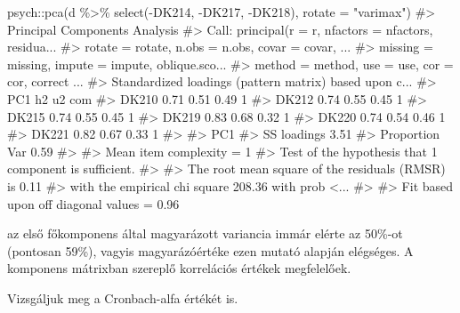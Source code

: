 \documentclass[
  letterpaper,
]{krantz}
\makeatletter
\newenvironment{Shaded}{\begin{snugshade}}{\end{snugshade}}
\newcommand{\AttributeTok}[1]{\textcolor[rgb]{0.40,0.45,0.13}{#1}}
\newcommand{\CommentTok}[1]{\textcolor[rgb]{0.37,0.37,0.37}{#1}}
\newcommand{\FunctionTok}[1]{\textcolor[rgb]{0.28,0.35,0.67}{#1}}
\newcommand{\NormalTok}[1]{\textcolor[rgb]{0.00,0.23,0.31}{#1}}
\newcommand{\SpecialCharTok}[1]{\textcolor[rgb]{0.37,0.37,0.37}{#1}}
\newcommand{\StringTok}[1]{\textcolor[rgb]{0.13,0.47,0.30}{#1}}
\newenvironment{kframe}{%
\medskip{}
\setlength{\fboxsep}{.8em}
 \def\at@end@of@kframe{}%
 \ifinner\ifhmode%
  \def\at@end@of@kframe{\end{minipage}}%
  \begin{minipage}{\columnwidth}%
 \fi\fi%
 \def\FrameCommand##1{\hskip\@totalleftmargin \hskip-\fboxsep
 \colorbox{shadecolor}{##1}\hskip-\fboxsep
     \hskip-\linewidth \hskip-\@totalleftmargin \hskip\columnwidth}%
 \MakeFramed {\advance\hsize-\width
   \@totalleftmargin\z@ \linewidth\hsize
   \@setminipage}}%
 {\par\unskip\endMakeFramed%
 \at@end@of@kframe}
\renewenvironment{Shaded}{\begin{kframe}}{\end{kframe}}
\makeatother
\begin{document}
\begin{Shaded}
\begin{Highlighting}[]
\NormalTok{psych}\SpecialCharTok{::}\FunctionTok{pca}\NormalTok{(d }\SpecialCharTok{\%\textgreater{}\%}
    \FunctionTok{select}\NormalTok{(}\SpecialCharTok{{-}}\NormalTok{DK214, }\SpecialCharTok{{-}}\NormalTok{DK217, }\SpecialCharTok{{-}}\NormalTok{DK218), }\AttributeTok{rotate =} \StringTok{"varimax"}\NormalTok{)}
\CommentTok{\#\textgreater{} Principal Components Analysis}
\CommentTok{\#\textgreater{} Call: principal(r = r, nfactors = nfactors, residua...}
\CommentTok{\#\textgreater{}     rotate = rotate, n.obs = n.obs, covar = covar, ...}
\CommentTok{\#\textgreater{}     missing = missing, impute = impute, oblique.sco...}
\CommentTok{\#\textgreater{}     method = method, use = use, cor = cor, correct ...}
\CommentTok{\#\textgreater{} Standardized loadings (pattern matrix) based upon c...}
\CommentTok{\#\textgreater{}        PC1   h2   u2 com}
\CommentTok{\#\textgreater{} DK210 0.71 0.51 0.49   1}
\CommentTok{\#\textgreater{} DK212 0.74 0.55 0.45   1}
\CommentTok{\#\textgreater{} DK215 0.74 0.55 0.45   1}
\CommentTok{\#\textgreater{} DK219 0.83 0.68 0.32   1}
\CommentTok{\#\textgreater{} DK220 0.74 0.54 0.46   1}
\CommentTok{\#\textgreater{} DK221 0.82 0.67 0.33   1}
\CommentTok{\#\textgreater{} }
\CommentTok{\#\textgreater{}                 PC1}
\CommentTok{\#\textgreater{} SS loadings    3.51}
\CommentTok{\#\textgreater{} Proportion Var 0.59}
\CommentTok{\#\textgreater{} }
\CommentTok{\#\textgreater{} Mean item complexity =  1}
\CommentTok{\#\textgreater{} Test of the hypothesis that 1 component is sufficient.}
\CommentTok{\#\textgreater{} }
\CommentTok{\#\textgreater{} The root mean square of the residuals (RMSR) is  0.11 }
\CommentTok{\#\textgreater{}  with the empirical chi square  208.36  with prob \textless{}...}
\CommentTok{\#\textgreater{} }
\CommentTok{\#\textgreater{} Fit based upon off diagonal values = 0.96}
\end{Highlighting}
\end{Shaded}

az első főkomponens által magyarázott variancia immár elérte az 50\%-ot
(pontosan 59\%), vagyis magyarázóértéke ezen mutató alapján elégséges. A
komponens mátrixban szereplő korrelációs értékek megfelelőek.

Vizsgáljuk meg a Cronbach-alfa értékét is.
\end{document}
